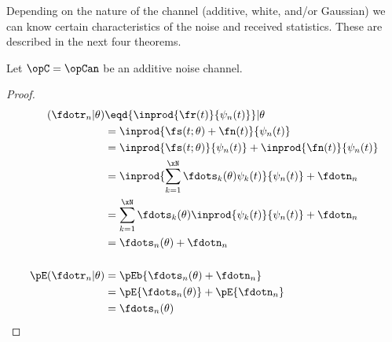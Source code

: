 Depending on the nature of the channel (additive, white, and/or Gaussian)
we can know certain characteristics of the noise and received statistics.
These are described in the next four theorems.


\begin{theorem}%
\label{thm:an_stats}
Let $\opC=\opCan$ be an additive noise channel.
\end{theorem}
\begin{proof}
\begin{align*}
   (\fdotr_n |\theta)
     &\eqd {\inprod{\fr(t)}{\psi_n(t)}}  |\theta
   \\&=    {\inprod{\fs(t;\theta)+\fn(t)}{\psi_n(t)}}
   \\&=    {\inprod{\fs(t;\theta)}{\psi_n(t)}} +   {\inprod{\fn(t)}{\psi_n(t)}}
   \\&=    \inprod{\sum_{k=1}^\xN \fdots_k(\theta) \psi_k(t)}{\psi_n(t)} + \fdotn_n
   \\&=    \sum_{k=1}^\xN \fdots_k(\theta) \inprod{\psi_k(t)}{\psi_n(t)} + \fdotn_n
   \\&=    \fdots_n(\theta)  + \fdotn_n
\\ \\
   \pE({\fdotr_n} | \theta)
     &= \pEb{\fdots_n(\theta)  + \fdotn_n}
   \\&= \pE{\fdots_n(\theta) } +   \pE{\fdotn_n}
   \\&= \fdots_n(\theta)
\end{align*}
\end{proof}


